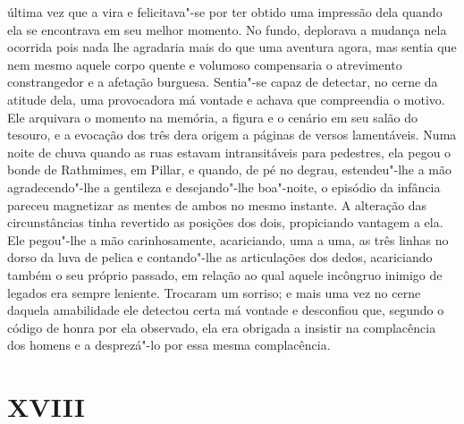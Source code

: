 última vez que a vira e felicitava"-se por ter obtido uma impressão dela
quando ela se encontrava em seu melhor momento.  No fundo, deplorava a
mudança nela ocorrida pois nada lhe agradaria mais do que uma aventura
agora, mas sentia que nem mesmo aquele corpo quente e volumoso
compensaria o atrevimento constrangedor e a afetação burguesa.
\label{sentia"-se"-capaz} Sentia"-se capaz de detectar, no cerne da atitude dela, uma provocadora
má vontade e achava que compreendia o motivo.  Ele arquivara o momento
na memória, a figura e o cenário em seu salão do tesouro, e a evocação
dos três dera origem a páginas de \label{versos"-lamentaveis} versos lamentáveis.  Numa noite de
chuva quando as ruas estavam intransitáveis para pedestres, ela pegou o
bonde de Rathmimes, em Pillar, e quando, de pé no degrau, estendeu"-lhe
a mão agradecendo"-lhe a gentileza e desejando"-lhe boa"-noite, o
\label{episodio"-da} episódio da infância pareceu magnetizar as mentes de ambos no mesmo
instante.  A alteração das circunstâncias tinha revertido as posições
dos dois, propiciando vantagem a ela.  Ele pegou"-lhe a mão
carinhosamente, acariciando, uma a uma, as três linhas no \label{dorso"-da} dorso da
luva de pelica e contando"-lhe as articulações dos dedos, acariciando
também o seu próprio passado, em relação ao qual aquele incôngruo
inimigo de legados era sempre leniente.  Trocaram um
sorriso; e mais uma vez no cerne daquela amabilidade ele detectou certa
má vontade e desconfiou que, segundo o código de honra por ela
observado, ela era obrigada a insistir na complacência dos homens e a
desprezá"-lo por essa mesma complacência.


\section*{XVIII}

